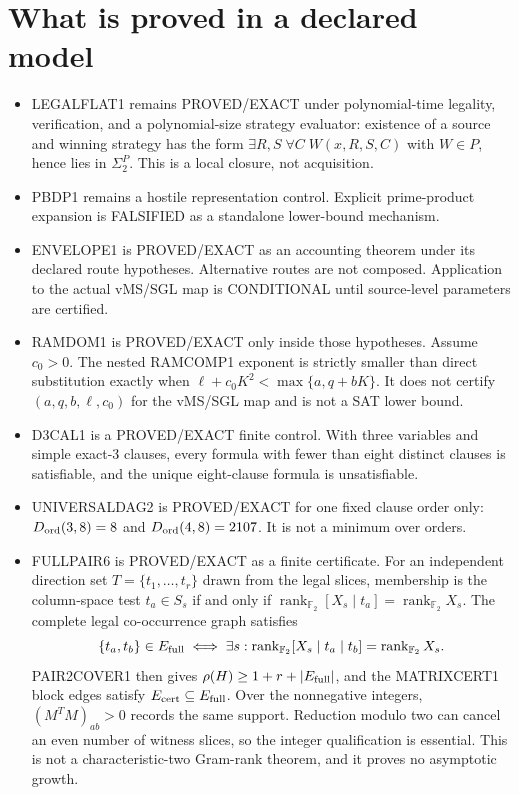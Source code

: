 \documentclass[11pt]{article}
\begin{document}
\section*{What is proved in a declared model}
\begin{itemize}
\item LEGALFLAT1 remains PROVED/EXACT under polynomial-time legality, verification, and a
polynomial-size strategy evaluator: existence of a source and winning strategy has the form
\(\exists R,S\;\forall C\;W(x,R,S,C)\) with \(W\in P\), hence lies in \(\Sigma_2^P\).
This is a local closure, not acquisition.
\item PBDP1 remains a hostile representation control. Explicit prime-product expansion is
FALSIFIED as a standalone lower-bound mechanism.
\item ENVELOPE1 is PROVED/EXACT as an accounting theorem under its declared route
hypotheses. Alternative routes are not composed. Application to the actual vMS/SGL map
is CONDITIONAL until source-level parameters are certified.
\item RAMDOM1 is PROVED/EXACT only inside those hypotheses. Assume \(c_0>0\). The nested
RAMCOMP1 exponent is strictly smaller than direct substitution exactly when
\(\ell+c_0K^2<\max\{a,q+bK\}\). It does not certify \((a,q,b,\ell,c_0)\) for the
vMS/SGL map and is not a SAT lower bound.
\item D3CAL1 is a PROVED/EXACT finite control. With three variables and simple exact-3
clauses, every formula with fewer than eight distinct clauses is satisfiable, and the
unique eight-clause formula is unsatisfiable.
\item UNIVERSALDAG2 is PROVED/EXACT for one fixed clause order only:
\(D_{\rm ord}(3,8)=8\) and \(D_{\rm ord}(4,8)=2107\). It is not a minimum over orders.
\item FULLPAIR6 is PROVED/EXACT as a finite certificate. For an independent direction set
\(T=\{t_1,\ldots,t_r\}\) drawn from the legal slices, membership is the column-space test
\(t_a\in S_s\) if and only if
\(\operatorname{rank}_{\mathbb F_2}[X_s\mid t_a]=\operatorname{rank}_{\mathbb F_2}X_s\).
The complete legal co-occurrence graph satisfies
\[
\{t_a,t_b\}\in E_{\rm full}
\iff
\exists s:\operatorname{rank}_{\mathbb F_2}[X_s\mid t_a\mid t_b]
=\operatorname{rank}_{\mathbb F_2}X_s.
\]
PAIR2COVER1 then gives \(\rho(H)\ge 1+r+|E_{\rm full}|\), and the MATRIXCERT1 block edges
satisfy \(E_{\rm cert}\subseteq E_{\rm full}\). Over the nonnegative integers,
\((M^TM)_{ab}>0\) records the same support. Reduction modulo two can cancel an even number
of witness slices, so the integer qualification is essential. This is not a
characteristic-two Gram-rank theorem, and it proves no asymptotic growth.
\end{itemize}
\end{document}
